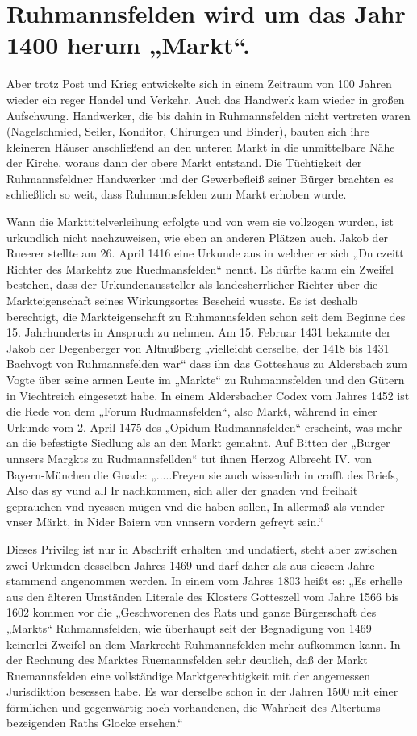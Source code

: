\documentclass[12pt,a4pager]{book}
\begin{document}
\section{Ruhmannsfelden wird um das Jahr 1400 herum „Markt“.}

Aber trotz Post und Krieg entwickelte sich in einem Zeitraum von 100 Jahren
wieder ein reger Handel und Verkehr. Auch das Handwerk kam wieder in großen
Aufschwung. Handwerker, die bis dahin in Ruhmannsfelden nicht vertreten waren
(Nagelschmied, Seiler, Konditor, Chirurgen und Binder), bauten sich ihre
kleineren Häuser anschließend an den unteren Markt in die unmittelbare Nähe der
Kirche, woraus dann der obere Markt entstand. Die Tüchtigkeit der
Ruhmannsfeldner Handwerker und der Gewerbefleiß seiner Bürger brachten es
schließlich so weit, dass Ruhmannsfelden zum Markt erhoben wurde.

Wann die Markttitelverleihung erfolgte und von wem sie vollzogen wurden, ist
urkundlich nicht nachzuweisen, wie eben an anderen Plätzen auch. Jakob der
Rueerer stellte am 26. April 1416 eine Urkunde aus in welcher er sich „Dn czeitt
Richter des Markehtz zue Ruedmansfelden“ nennt. Es dürfte kaum ein Zweifel
bestehen, dass der Urkundenaussteller als landesherrlicher Richter über die
Markteigenschaft seines Wirkungsortes Bescheid wusste. Es ist deshalb
berechtigt, die Markteigenschaft zu Ruhmannsfelden schon seit dem Beginne des
15. Jahrhunderts in Anspruch zu nehmen. Am 15. Februar 1431 bekannte der Jakob
der Degenberger von Altnußberg „vielleicht derselbe, der 1418 bis 1431 Bachvogt
von Ruhmannsfelden war“ dass ihn das Gotteshaus zu Aldersbach zum Vogte über
seine armen Leute im „Markte“ zu Ruhmannsfelden und den Gütern in Viechtreich
eingesetzt habe. In einem Aldersbacher Codex vom Jahres 1452 ist die Rede von
dem „Forum Rudmannsfelden“, also Markt, während in einer Urkunde vom 2. April
1475 des „Opidum Rudmannsfelden“ erscheint, was mehr an die befestigte Siedlung
als an den Markt gemahnt. Auf Bitten der „Burger unnsers Margkts zu
Rudmannsfellden“ tut ihnen Herzog Albrecht IV. von Bayern-München die Gnade:
„.....Freyen sie auch wissenlich in crafft des Briefs, Also das sy vund all Ir
nachkommen, sich aller der gnaden vnd freihait geprauchen vnd nyessen mügen vnd
die haben sollen, In allermaß als vnnder vnser Märkt, in Nider Baiern von
vnnsern vordern gefreyt sein.“

Dieses Privileg ist nur in Abschrift erhalten und undatiert, steht aber zwischen
zwei Urkunden desselben Jahres 1469 und darf daher als aus diesem Jahre stammend
angenommen werden. In einem vom Jahres 1803 heißt es: „Es erhelle aus den
älteren Umständen Literale des Klosters Gotteszell vom Jahre 1566 bis 1602
kommen vor die „Geschworenen des Rats und ganze Bürgerschaft des „Markts“
Ruhmannsfelden, wie überhaupt seit der Begnadigung von 1469 keinerlei Zweifel an
dem Markrecht Ruhmannsfelden mehr aufkommen kann. In der Rechnung des Marktes
Ruemannsfelden sehr deutlich, daß der Markt Ruemannsfelden eine vollständige
Marktgerechtigkeit mit der angemessen Jurisdiktion besessen habe. Es war
derselbe schon in der Jahren 1500 mit einer förmlichen und gegenwärtig noch
vorhandenen, die Wahrheit des Altertums bezeigenden Raths Glocke ersehen.“
\end{document}
